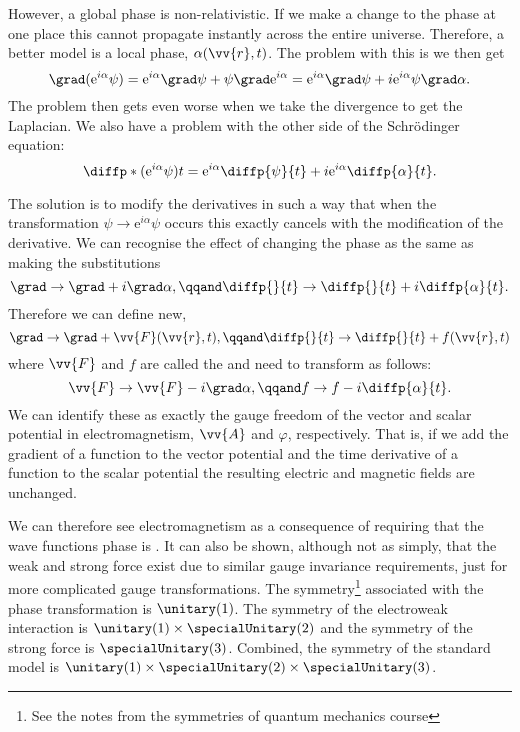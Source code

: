 \documentclass[fleqn]{NotesClass}
\newcommand*{\e}{\mathrm{e}}
\begin{document}
    However, a global phase is non-relativistic.
    If we make a change to the phase at one place this cannot propagate instantly across the entire universe.
    Therefore, a better model is a local phase, \(\alpha(\vv{r}, t)\).
    The problem with this is we then get
    \begin{equation}
        \grad(\e^{i\alpha}\psi) = \e^{i\alpha}\grad\psi + \psi \grad\e^{i\alpha} = \e^{i\alpha}\grad\psi + i\e^{i\alpha}\psi\grad\alpha.
    \end{equation}
    The problem then gets even worse when we take the divergence to get the Laplacian.
    We also have a problem with the other side of the Schrödinger equation:
    \begin{equation}
        \diffp*{(\e^{i\alpha}\psi)}{t} = \e^{i\alpha}\diffp{\psi}{t} + i\e^{i\alpha}\diffp{\alpha}{t}.
    \end{equation}
    
    The solution is to modify the derivatives in such a way that when the transformation \(\psi \to \e^{i\alpha}\psi\) occurs this exactly cancels with the modification of the derivative.
    We can recognise the effect of changing the phase as the same as making the substitutions
    \begin{equation}
        \grad \to \grad + i\grad \alpha, \qqand \diffp{}{t} \to \diffp{}{t} + i \diffp{\alpha}{t}.
    \end{equation}
    Therefore we can define new, 
    \begin{equation}
        \grad \to \grad + \vv{F}(\vv{r}, t), \qqand \diffp{}{t} \to \diffp{}{t} + f(\vv{r}, t)
    \end{equation}
    where \(\vv{F}\) and \(f\) are called the  and need to transform as follows:
    \begin{equation}
        \vv{F} \to \vv{F} - i\grad\alpha, \qqand f \to f - i \diffp{\alpha}{t}.
    \end{equation}
    We can identify these as exactly the gauge freedom of the vector and scalar potential in electromagnetism, \(\vv{A}\) and \(\varphi\), respectively.
    That is, if we add the gradient of a function to the vector potential and the time derivative of a function to the scalar potential the resulting electric and magnetic fields are unchanged.
    
    We can therefore see electromagnetism as a consequence of requiring that the wave functions phase is .
    It can also be shown, although not as simply, that the weak and strong force exist due to similar gauge invariance requirements, just for more complicated gauge transformations.
    The symmetry\footnote{See the notes from the symmetries of quantum mechanics course} associated with the phase transformation is \(\unitary(1)\).
    The symmetry of the electroweak interaction is \(\unitary(1)\times\specialUnitary(2)\) and the symmetry of the strong force is \(\specialUnitary(3)\).
    Combined, the symmetry of the standard model is \(\unitary(1)\times\specialUnitary(2)\times\specialUnitary(3)\).
    
\end{document}
